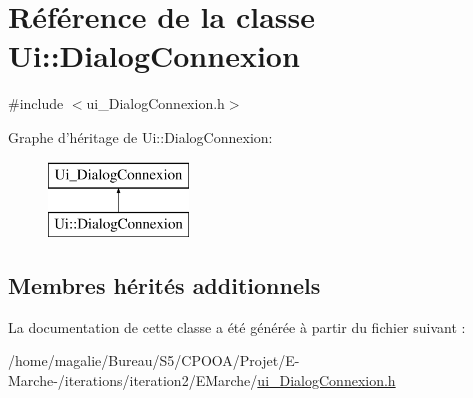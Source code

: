 \hypertarget{class_ui_1_1_dialog_connexion}{\section{Référence de la classe Ui\-:\-:Dialog\-Connexion}
\label{class_ui_1_1_dialog_connexion}
}


{\ttfamily \#include $<$ui\-\_\-\-Dialog\-Connexion.\-h$>$}

Graphe d'héritage de Ui\-:\-:Dialog\-Connexion\-:\begin{figure}[H]
\begin{center}
\leavevmode
\includegraphics[height=2.000000cm]{class_ui_1_1_dialog_connexion}
\end{center}
\end{figure}
\subsection*{Membres hérités additionnels}


La documentation de cette classe a été générée à partir du fichier suivant \-:\begin{DoxyCompactItemize}
\item 
/home/magalie/\-Bureau/\-S5/\-C\-P\-O\-O\-A/\-Projet/\-E-\/\-Marche-\//iterations/iteration2/\-E\-Marche/\hyperlink{ui___dialog_connexion_8h}{ui\-\_\-\-Dialog\-Connexion.\-h}\end{DoxyCompactItemize}
